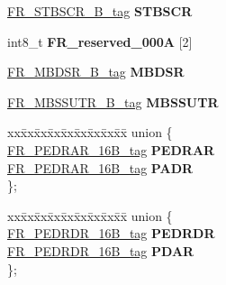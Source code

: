\begin{DoxyCompactItemize}
\begin{tabbing}
\end{tabbing}\item 
\mbox{\label{structFR__struct__tag_a6624d34376b2dc084dc9b90186bf130d}} 
\mbox{\hyperlink{unionFR__STBSCR__16B__tag}{F\+R\+\_\+\+S\+T\+B\+S\+C\+R\+\_\+B\+\_\+tag}} {\bfseries S\+T\+B\+S\+CR}
\item 
\mbox{\label{structFR__struct__tag_a3529a04f6d4ea66fd71035eb0e0377a9}} 
int8\+\_\+t {\bfseries F\+R\+\_\+reserved\+\_\+000A} \mbox{[}2\mbox{]}
\item 
\mbox{\label{structFR__struct__tag_a058959b2233bbf9e4e84166a041eb905}} 
\mbox{\hyperlink{unionFR__MBDSR__16B__tag}{F\+R\+\_\+\+M\+B\+D\+S\+R\+\_\+B\+\_\+tag}} {\bfseries M\+B\+D\+SR}
\item 
\mbox{\label{structFR__struct__tag_ab4baf43aa257b65aa985418c2b52ff67}} 
\mbox{\hyperlink{unionFR__MBSSUTR__16B__tag}{F\+R\+\_\+\+M\+B\+S\+S\+U\+T\+R\+\_\+B\+\_\+tag}} {\bfseries M\+B\+S\+S\+U\+TR}
\item 
\mbox{\label{structFR__struct__tag_aabe47784e50aea390cb9f949e5d25c17}} 
\begin{tabbing}
xx\=xx\=xx\=xx\=xx\=xx\=xx\=xx\=xx\=\kill
union \{\\
\>\mbox{\hyperlink{unionFR__PEDRAR__16B__tag}{FR\_PEDRAR\_16B\_tag}} {\bfseries PEDRAR}\\
\>\mbox{\hyperlink{unionFR__PEDRAR__16B__tag}{FR\_PEDRAR\_16B\_tag}} {\bfseries PADR}\\
\}; \\

\end{tabbing}\item 
\mbox{\label{structFR__struct__tag_aeede6a192652a32c49fae1c11200739d}} 
\begin{tabbing}
xx\=xx\=xx\=xx\=xx\=xx\=xx\=xx\=xx\=\kill
union \{\\
\>\mbox{\hyperlink{unionFR__PEDRDR__16B__tag}{FR\_PEDRDR\_16B\_tag}} {\bfseries PEDRDR}\\
\>\mbox{\hyperlink{unionFR__PEDRDR__16B__tag}{FR\_PEDRDR\_16B\_tag}} {\bfseries PDAR}\\
\}; \\


\end{tabbing}
\end{DoxyCompactItemize}
